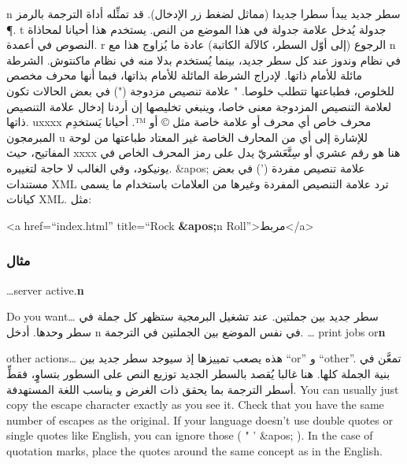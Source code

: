 \starttable[|l|l|l|]
\HL
\NC {} \NC {} \NC
{}\NC\AR
\HL
\NC {} n  \NC سطر جديد \NC يبدأ سطرا جديدا (مماثل لضغط زر
الإدخال). قد تمثِّله أداة الترجمة بالرمز ¶.\NC\AR
\HL
\NC {} t  \NC جدولة \NC يُدخل علامة جدولة في هذا الموضع من
النص. يستخدم هذا أحيانا لمحاذاة النصوص في أعمدة.\NC\AR
\HL
\NC {} r  \NC الرجوع (إلى أوّل السطر، كالآلة الكاتبة) \NC
عادة ما يُزاوج هذا مع ‪ n‬ في نظام وندوز عند كل سطر
جديد، بينما يُستخدم بدلا منه في نظام ماكنتوش.\NC\AR
\HL
\NC {} {}  \NC الشرطة مائلة للأمام ذاتها. 
\NC لإدراج الشرطة المائلة للأمام بذاتها، فبما أنها محرف مخصص للخلوص،
فطباعتها تتطلب خلوصا.\NC\AR
\HL
\NC {} " \NC علامة تنصيص مزدوجة (") \NC في بعض الحالات
تكون لعلامة التنصيص المزدوجة معنى خاصا، وينبغي تخليصها إن أردنا إدخال
علامة التنصيص ذاتها.\NC\AR
\HL
\NC {} uxxxx  \NC محرف خاص \NC أي محرف أو علامة خاصة مثل ©
أو ™. أحيانا يَستخدِم المبرمجون ‪ u‬ للإشارة إلى أي من
المحارف الخاصة غير المعتاد طباعتها من لوحة المفاتيح، حيث xxxx هنا هو
رقم عشري أو سِتَّعَشريّ يدل على رمز المحرف الخاص في يونيكود، وفي الغالب
لا حاجة لتغييره.\NC\AR
\HL
\NC \&apos;  \NC علامة تنصيص مفردة (') \NC في بعض مستندات XML ترد علامة
التنصيص المفردة وغيرها من العلامات باستخدام ما يسمى كيانات XML. مثل:

<a href=“index.html” title=“Rock {\bf \&apos;}n Roll”>مربط</a>\NC\AR
\HL
\stoptable
\subsubsection{مثال}
\starttable[|l|l|l|]
\HL
\NC {} \NC {} \NC
{}\NC\AR
\HL
\NC …server active.{\bf {} n}

Do you want…  \NC سطر جديد بين جملتين. عند تشغيل البرمجية ستظهر كل جملة
في سطر وحدها. \NC أدخل ‪ n‬ في نفس الموضع بين الجملتين
في الترجمة.\NC\AR
\HL
\NC … print jobs or{\bf {} n}

other actions…  \NC هذه يصعب تمييزها إذ سيوجد سطر جديد بين “or” و
“other”. \NC تمعَّن في بنية الجملة كلها. هنا غالبا يُقصد بالسطر الجديد
توزيع النص على السطور بتساوٍ، فقطِّ أسطر الترجمة بما يحقق ذات الغرض و
يناسب اللغة المستهدفة.\NC\AR
\HL
\stoptable
You can usually just copy the escape character exactly as you see it.
Check that you have the same number of escapes as the original. If your
language doesn’t use double quotes or single quotes like English, you
can ignore those (  "   '  \&apos; ).
In the case of quotation marks, place the quotes around the same
concept as in the English.

